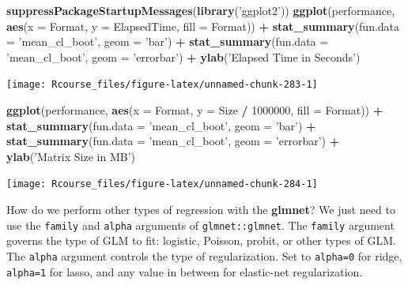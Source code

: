 \documentclass[]{book}
\newenvironment{Shaded}{\begin{snugshade}}{\end{snugshade}}
\newcommand{\KeywordTok}[1]{\textcolor[rgb]{0.13,0.29,0.53}{\textbf{#1}}}
\newcommand{\DataTypeTok}[1]{\textcolor[rgb]{0.13,0.29,0.53}{#1}}
\newcommand{\DecValTok}[1]{\textcolor[rgb]{0.00,0.00,0.81}{#1}}
\newcommand{\StringTok}[1]{\textcolor[rgb]{0.31,0.60,0.02}{#1}}
\newcommand{\OperatorTok}[1]{\textcolor[rgb]{0.81,0.36,0.00}{\textbf{#1}}}
\newcommand{\NormalTok}[1]{#1}
\theoremstyle{definition}
\theoremstyle{definition}
\theoremstyle{definition}
\theoremstyle{remark}
\begin{document}
\begin{Shaded}
\begin{Highlighting}[]
\KeywordTok{suppressPackageStartupMessages}\NormalTok{(}\KeywordTok{library}\NormalTok{(}\StringTok{'ggplot2'}\NormalTok{))}
\KeywordTok{ggplot}\NormalTok{(performance, }\KeywordTok{aes}\NormalTok{(}\DataTypeTok{x =}\NormalTok{ Format, }\DataTypeTok{y =}\NormalTok{ ElapsedTime, }\DataTypeTok{fill =}\NormalTok{ Format)) }\OperatorTok{+}
\StringTok{  }\KeywordTok{stat_summary}\NormalTok{(}\DataTypeTok{fun.data =} \StringTok{'mean_cl_boot'}\NormalTok{, }\DataTypeTok{geom =} \StringTok{'bar'}\NormalTok{) }\OperatorTok{+}
\StringTok{  }\KeywordTok{stat_summary}\NormalTok{(}\DataTypeTok{fun.data =} \StringTok{'mean_cl_boot'}\NormalTok{, }\DataTypeTok{geom =} \StringTok{'errorbar'}\NormalTok{) }\OperatorTok{+}
\StringTok{  }\KeywordTok{ylab}\NormalTok{(}\StringTok{'Elapsed Time in Seconds'}\NormalTok{) }
\end{Highlighting}
\end{Shaded}

\texttt{[image: Rcourse\_files/figure-latex/unnamed-chunk-283-1]}

\begin{Shaded}
\begin{Highlighting}[]
\KeywordTok{ggplot}\NormalTok{(performance, }\KeywordTok{aes}\NormalTok{(}\DataTypeTok{x =}\NormalTok{ Format, }\DataTypeTok{y =}\NormalTok{ Size }\OperatorTok{/}\StringTok{ }\DecValTok{1000000}\NormalTok{, }\DataTypeTok{fill =}\NormalTok{ Format)) }\OperatorTok{+}
\StringTok{  }\KeywordTok{stat_summary}\NormalTok{(}\DataTypeTok{fun.data =} \StringTok{'mean_cl_boot'}\NormalTok{, }\DataTypeTok{geom =} \StringTok{'bar'}\NormalTok{) }\OperatorTok{+}
\StringTok{  }\KeywordTok{stat_summary}\NormalTok{(}\DataTypeTok{fun.data =} \StringTok{'mean_cl_boot'}\NormalTok{, }\DataTypeTok{geom =} \StringTok{'errorbar'}\NormalTok{) }\OperatorTok{+}
\StringTok{  }\KeywordTok{ylab}\NormalTok{(}\StringTok{'Matrix Size in MB'}\NormalTok{) }
\end{Highlighting}
\end{Shaded}

\texttt{[image: Rcourse\_files/figure-latex/unnamed-chunk-284-1]}

How do we perform other types of regression with the \textbf{glmnet}? We
just need to use the \texttt{family} and \texttt{alpha} arguments of
\texttt{glmnet::glmnet}. The \texttt{family} argument governs the type
of GLM to fit: logistic, Poisson, probit, or other types of GLM. The
\texttt{alpha} argument controls the type of regularization. Set to
\texttt{alpha=0} for ridge, \texttt{alpha=1} for lasso, and any value in
between for elastic-net regularization.
\end{document}
